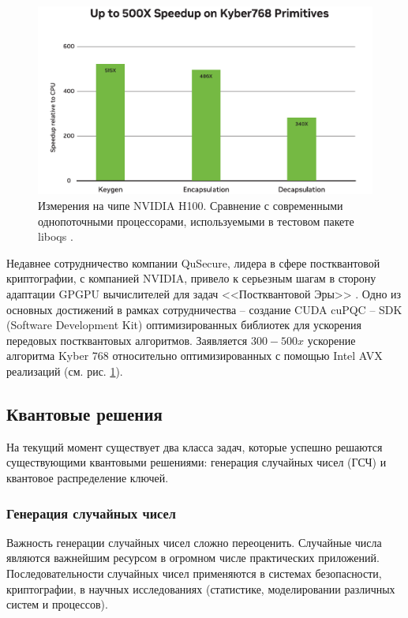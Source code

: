 \documentclass[a4paper,12pt]{article}
\begin{document}
\begin{figure}[h]
	\centering
	\includegraphics[width=0.7\linewidth]{images/quantum-computing-cupqc}
	\caption{Измерения на чипе NVIDIA H100. Сравнение с современными однопоточными процессорами, используемыми в тестовом пакете liboqs \cite{cuPQC}.}
	\label{fig:quantum-computing-cupqc}
\end{figure}
    
Недавнее сотрудничество компании QuSecure, лидера в сфере постквантовой криптографии, с компанией NVIDIA, привело к серьезным шагам в сторону адаптации GPGPU вычислителей для задач <<Постквантовой Эры>> \cite{cuPQC_Blog}. Одно из основных достижений в рамках сотрудничества -- создание CUDA cuPQC -- SDK (Software Development Kit) оптимизированных библиотек для ускорения передовых постквантовых алгоритмов. Заявляется $300-500x$ ускорение алгоритма Kyber 768 относительно оптимизированных с помощью Intel AVX реализаций (см. рис. \ref{fig:quantum-computing-cupqc}).  

\subsection{Квантовые решения}

На текущий момент существует два класса задач, которые успешно решаются существующими квантовыми решениями: генерация случайных чисел (ГСЧ) и квантовое распределение ключей.

\subsubsection{Генерация случайных чисел}

Важность генерации случайных чисел сложно переоценить. Случайные числа являются важнейшим ресурсом в огромном числе практических приложений. Последовательности случайных чисел применяются в системах безопасности, криптографии, в научных исследованиях (статистике, моделировании различных систем и процессов).
\end{document}
